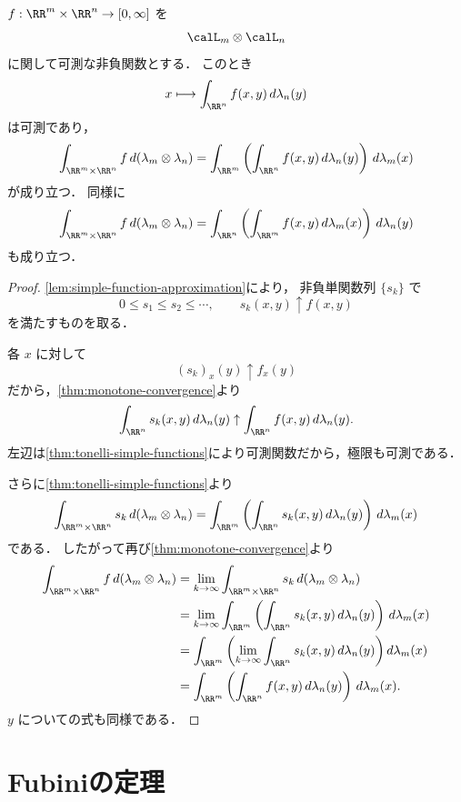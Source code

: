 \begin{theorem}[Tonelliの定理]\label{thm:tonelli}
$f:\RR^m\times\RR^n\to[0,\infty]$ を
\[
\calL_m\otimes\calL_n
\]
に関して可測な非負関数とする．
このとき
\[
x\longmapsto \int_{\RR^n}f(x,y)\,d\lambda_n(y)
\]
は可測であり，
\[
\int_{\RR^m\times\RR^n}f\,d(\lambda_m\otimes\lambda_n)
=
\int_{\RR^m}\left(\int_{\RR^n}f(x,y)\,d\lambda_n(y)\right)\,d\lambda_m(x)
\]
が成り立つ．
同様に
\[
\int_{\RR^m\times\RR^n}f\,d(\lambda_m\otimes\lambda_n)
=
\int_{\RR^n}\left(\int_{\RR^m}f(x,y)\,d\lambda_m(x)\right)\,d\lambda_n(y)
\]
も成り立つ．
\end{theorem}
\begin{proof}
\cref{lem:simple-function-approximation}により，
非負単関数列 $\{s_k\}$ で
\[
0\le s_1\le s_2\le\cdots,\qquad s_k(x,y)\uparrow f(x,y)
\]
を満たすものを取る．

各 $x$ に対して
\[
(s_k)_x(y)\uparrow f_x(y)
\]
だから，\cref{thm:monotone-convergence}より
\[
\int_{\RR^n}s_k(x,y)\,d\lambda_n(y)
\uparrow
\int_{\RR^n}f(x,y)\,d\lambda_n(y).
\]
左辺は\cref{thm:tonelli-simple-functions}により可測関数だから，極限も可測である．

さらに\cref{thm:tonelli-simple-functions}より
\[
\int_{\RR^m\times\RR^n}s_k\,d(\lambda_m\otimes\lambda_n)
=
\int_{\RR^m}\left(\int_{\RR^n}s_k(x,y)\,d\lambda_n(y)\right)\,d\lambda_m(x)
\]
である．
したがって再び\cref{thm:monotone-convergence}より
\begin{align*}
\int_{\RR^m\times\RR^n}f\,d(\lambda_m\otimes\lambda_n)
&=
\lim_{k\to\infty}\int_{\RR^m\times\RR^n}s_k\,d(\lambda_m\otimes\lambda_n) \\
&=
\lim_{k\to\infty}
\int_{\RR^m}\left(\int_{\RR^n}s_k(x,y)\,d\lambda_n(y)\right)\,d\lambda_m(x) \\
&=
\int_{\RR^m}
\left(
\lim_{k\to\infty}\int_{\RR^n}s_k(x,y)\,d\lambda_n(y)
\right)
d\lambda_m(x) \\
&=
\int_{\RR^m}\left(\int_{\RR^n}f(x,y)\,d\lambda_n(y)\right)\,d\lambda_m(x).
\end{align*}
$y$ についての式も同様である．
\end{proof}

\section{Fubiniの定理}

